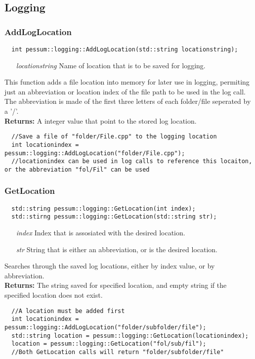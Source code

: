 \documentclass{subfiles}
\begin{document}
\subsection{Logging}
\newpage
\subsubsection{AddLogLocation}
\begin{lstlisting}
  int pessum::logging::AddLogLocation(std::string locationstring);
\end{lstlisting}
\begin{enumerate}
	\item[\emph{locationstring}] Name of location that is to be saved for logging.
\end{enumerate}
This function adds a file location into memory for later use in logging, permiting just an abbreviation or location index of the file path to be used in the log call. The abbreviation is made of the first three letters of each folder/file seperated by a '/'.\\
\textbf{Returns:} A integer value that point to the stored log location.
\begin{lstlisting}
  //Save a file of "folder/File.cpp" to the logging location
  int locationindex = pessum::logging::AddLogLocation("folder/File.cpp");
  //locationindex can be used in log calls to reference this locaiton, or the abbreviation "fol/Fil" can be used
\end{lstlisting}
\newpage
\subsubsection{GetLocation}
\begin{lstlisting}
  std::string pessum::logging::GetLocation(int index);
  std::stirng pessum::logging::GetLocation(std::string str);
\end{lstlisting}
\begin{enumerate}
	\item[\emph{index}] Index that is assosiated with the desired location.
	\item[\emph{str}] String that is either an abbreviation, or is the desired location.
\end{enumerate}
Searches through the saved log locations, either by index value, or by abbreviation. \\
\textbf{Returns:} The string saved for specified location, and empty string if the specified location does not exist.
\begin{lstlisting}
  //A location must be added first
  int locationindex = pessum::logging::AddLogLocation("folder/subfolder/file");
  std::string location = pessum::logging::GetLocation(locationindex);
  location = pessum::logging::GetLocation("fol/sub/fil");
  //Both GetLocation calls will return "folder/subfolder/file"
\end{lstlisting}
\newpage
\end{document}
